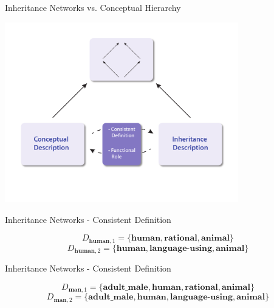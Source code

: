 \documentclass{beamer}
\begin{document}
\begin{frame}{Inheritance Networks vs. Conceptual Hierarchy}
\begin{center}
\includegraphics[width=4in]{InheritanceVsConcepts_2}
\end{center}
\end{frame}

\begin{frame}{Inheritance Networks - Consistent Definition}
\centerline{
}
\vspace{.25in}
$$D_{\textbf{human},1}=\{\textbf{human},\textbf{rational},\textbf{animal}\}$$
$$D_{\textbf{human},2}=\{\textbf{human},\textbf{language-using},\textbf{animal}\}$$
\end{frame}

\begin{frame}{Inheritance Networks - Consistent Definition}
\centerline{
}
\vspace{.25in}
$$D_{\textbf{man},1}=\{\textbf{adult\_male},\textbf{human},\textbf{rational},\textbf{animal}\}$$
$$D_{\textbf{man},2}=\{\textbf{adult\_male},\textbf{human},\textbf{language-using},\textbf{animal}\}$$
\end{frame}
\end{document}
